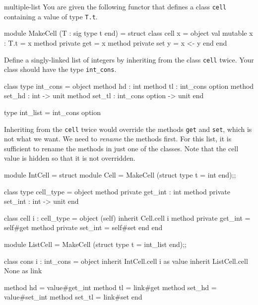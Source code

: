 %
\begin{exercise}{multiple-list}
You are given the following functor that defines a class \hbox{\lstinline/cell/}
containing a value of type \hbox{\lstinline/T.t/}.

\begin{ocaml}
module MakeCell (T : sig type t end) =
struct
    class cell x =
    object
        val mutable x : T.t = x
        method private get = x
        method private set y = x <- y
    end
end
\end{ocaml}
%
Define a singly-linked list of integers by inheriting from the class \hbox{\lstinline/cell/}
twice.  Your class should have the type \hbox{\lstinline/int_cons/}.

\begin{ocaml}
class type int_cons =
object
   method hd : int
   method tl : int_cons option
   method set_hd : int -> unit
   method set_tl : int_cons option -> unit
end

type int_list = int_cons option
\end{ocaml}

\begin{answer}\ifanswers
Inheriting from the \hbox{\lstinline/cell/} twice would override the
methods \hbox{\lstinline/get/} and \hbox{\lstinline/set/}, which is not what we
want.  We need to \emph{rename} the methods first.  For this list, it
is sufficient to rename the methods in just one of the classes.  Note
that the cell value is hidden so that it is not overridden.

\begin{ocaml}
module IntCell =
struct
   module Cell = MakeCell (struct type t = int end);;

   class type cell_type =
   object
      method private get_int : int
      method private set_int : int -> unit
   end

   class cell i : cell_type =
   object (self)
      inherit Cell.cell i
      method private get_int = self#get
      method private set_int = self#set
   end
end

module ListCell = MakeCell (struct type t = int_list end);;

class cons i : int_cons =
object
    inherit IntCell.cell i as value
    inherit ListCell.cell None as link

    method hd = value#get_int
    method tl = link#get
    method set_hd = value#set_int
    method set_tl = link#set
end
\end{ocaml}
\fi\end{answer}
\end{exercise}    
    
